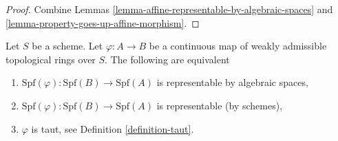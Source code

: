 \begin{proof}
Combine Lemmas \ref{lemma-affine-representable-by-algebraic-spaces} and
\ref{lemma-property-goes-up-affine-morphism}.
\end{proof}

\begin{lemma}
\label{lemma-representable-affine}
Let $S$ be a scheme. Let $\varphi : A \to B$ be a continuous map of
weakly admissible topological rings over $S$. The following
are equivalent
\begin{enumerate}
\item $\text{Spf}(\varphi) : \text{Spf}(B) \to \text{Spf}(A)$
is representable by algebraic spaces,
\item $\text{Spf}(\varphi) : \text{Spf}(B) \to \text{Spf}(A)$
is representable (by schemes),
\item $\varphi$ is taut, see Definition \ref{definition-taut}.
\end{enumerate}
\end{lemma}

